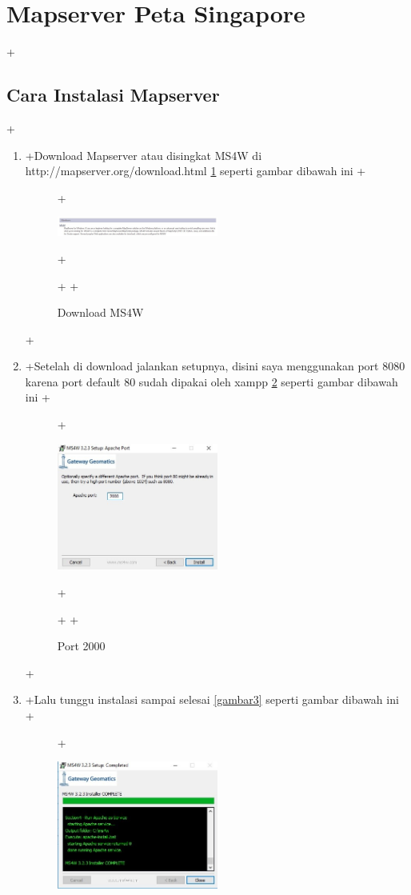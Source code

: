 \section{Mapserver Peta Singapore}
 +\subsection{Cara Instalasi Mapserver}
 +\begin{enumerate}
 +\item
 +Download Mapserver atau disingkat MS4W di http://mapserver.org/download.html \ref{gambar1} seperti gambar dibawah ini
 +\begin{figure}[ht]
 +	    \centerline{\includegraphics[width=0.50\textwidth]{figures/img1}}
 +	    \caption{Download MS4W}
 +		\label{gambar1}
 +		\end{figure}
 +\item
 +Setelah di download jalankan setupnya, disini saya menggunakan port 8080 karena port default 80 sudah dipakai oleh xampp \ref{gambar2} seperti gambar dibawah ini
 +\begin{figure}[ht]
 +	    \centerline{\includegraphics[width=0.50\textwidth]{figures/img2}}
 +	    \caption{Port 2000}
 +		\label{gambar2}
 +		\end{figure}
 +\item
 +Lalu tunggu instalasi sampai selesai \ref{gambar3} seperti gambar dibawah ini
 +\begin{figure}[ht]
 +	    \centerline{\includegraphics[width=0.50\textwidth]{figures/img3}}

\end{figure}
\end{enumerate}
